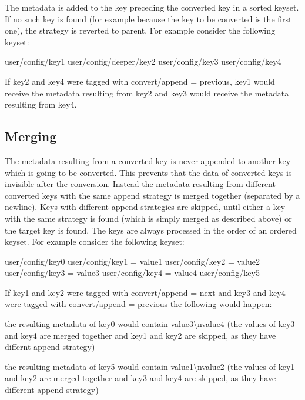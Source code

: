 The metadata is added to the key preceding the converted key in a sorted keyset. If no such key is found (for example because the key to be converted is the first one), the strategy is reverted to parent. For example consider the following keyset\+: \begin{DoxyVerb}user/config/key1
user/config/deeper/key2
user/config/key3
user/config/key4
\end{DoxyVerb}


If key2 and key4 were tagged with {\ttfamily convert/append = previous}, key1 would receive the metadata resulting from key2 and key3 would receive the metadata resulting from key4.

\subsection*{Merging}

The metadata resulting from a converted key is never appended to another key which is going to be converted. This prevents that the data of converted keys is invisible after the conversion. Instead the metadata resulting from different converted keys with the same append strategy is merged together (separated by a newline). Keys with different append strategies are skipped, until either a key with the same strategy is found (which is simply merged as described above) or the target key is found. The keys are always processed in the order of an ordered keyset. For example consider the following keyset\+: \begin{DoxyVerb}user/config/key0
user/config/key1 = value1
user/config/key2 = value2
user/config/key3 = value3
user/config/key4 = value4
user/config/key5
\end{DoxyVerb}


If key1 and key2 were tagged with {\ttfamily convert/append = next} and key3 and key4 were tagged with {\ttfamily convert/append = previous} the following would happen\+:
\begin{DoxyItemize}
\item the resulting metadata of key0 would contain {\ttfamily value3\textbackslash{}nvalue4} (the values of key3 and key4 are merged together and key1 and key2 are skipped, as they have differnt append strategy)
\item the resulting metadata of key5 would contain {\ttfamily value1\textbackslash{}nvalue2} (the values of key1 and key2 are merged together and key3 and key4 are skipped, as they have different append strategy)
\end{DoxyItemize}

